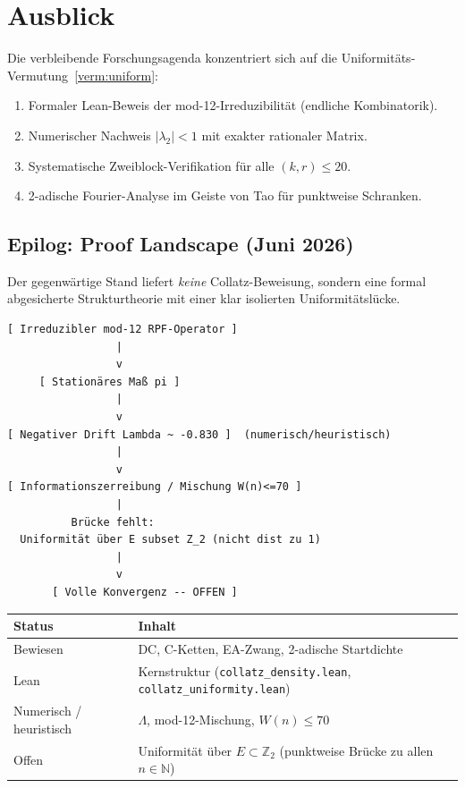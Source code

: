 \documentclass[12pt,a4paper]{article}
\newcommand{\N}{\mathbb{N}}
\newcommand{\Ztwo}{\mathbb{Z}_2}
\begin{document}
\section{Ausblick}
\label{sec:ausblick}

Die verbleibende Forschungsagenda konzentriert sich auf die
Uniformitäts-Vermutung~\ref{verm:uniform}:
\begin{enumerate}
  \item Formaler Lean-Beweis der mod-12-Irreduzibilität (endliche Kombinatorik).
  \item Numerischer Nachweis $|\lambda_2| < 1$ mit exakter rationaler Matrix.
  \item Systematische Zweiblock-Verifikation für alle $(k,r) \leq 20$.
  \item 2-adische Fourier-Analyse im Geiste von Tao für punktweise Schranken.
\end{enumerate}

\subsection{Epilog: Proof Landscape (Juni 2026)}

\begin{tcolorbox}[kern,title={Kernaussage}]
Der gegenwärtige Stand liefert \emph{keine} Collatz-Beweisung, sondern eine
formal abgesicherte Strukturtheorie mit einer klar isolierten
Uniformitätslücke.
\end{tcolorbox}

\begin{center}
\begin{verbatim}
[ Irreduzibler mod-12 RPF-Operator ]
                 |
                 v
     [ Stationäres Maß pi ]
                 |
                 v
[ Negativer Drift Lambda ~ -0.830 ]  (numerisch/heuristisch)
                 |
                 v
[ Informationszerreibung / Mischung W(n)<=70 ]
                 |
          Brücke fehlt:
  Uniformität über E subset Z_2 (nicht dist zu 1)
                 |
                 v
       [ Volle Konvergenz -- OFFEN ]
\end{verbatim}
\end{center}

\begin{center}
\renewcommand{\arraystretch}{1.35}
\begin{tabular}{@{}ll@{}}
\toprule
\textbf{Status} & \textbf{Inhalt} \\
\midrule
Bewiesen & DC, C-Ketten, EA-Zwang, 2-adische Startdichte \\
Lean & Kernstruktur (\texttt{collatz\_density.lean}, \texttt{collatz\_uniformity.lean}) \\
Numerisch / heuristisch & $\Lambda$, mod-12-Mischung, $W(n)\leq 70$ \\
Offen & Uniformität über $E\subset\Ztwo$ (punktweise Brücke zu allen $n\in\N$) \\
\bottomrule
\end{tabular}
\end{center}
\end{document}
